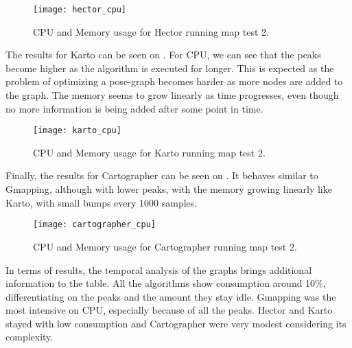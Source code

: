 \begin{figure}[!ht]
    \centering
    \texttt{[image: hector\_cpu]}
    \caption{CPU and Memory usage for Hector running map test 2.}
    \label{fig:hector_cpu}
\end{figure}

The results for Karto can be seen on . For CPU, we can see that the peaks become higher as the algorithm is executed for longer. This is expected as the problem of optimizing a pose-graph becomes harder as more nodes are added to the graph. The memory seems to grow linearly as time progresses, even though no more information is being added after some point in time.

\begin{figure}[!ht]
    \centering
    \texttt{[image: karto\_cpu]}
    \caption{CPU and Memory usage for Karto running map test 2.}
    \label{fig:karto_cpu}
\end{figure}

Finally, the results for Cartographer can be seen on . It behaves similar to Gmapping, although with lower peaks, with the memory growing linearly like Karto, with small bumps every 1000 samples.

\begin{figure}[!ht]
    \centering
    \texttt{[image: cartographer\_cpu]}
    \caption{CPU and Memory usage for Cartographer running map test 2.}
    \label{fig:cartographer_cpu}
\end{figure}

In terms of results, the temporal analysis of the graphs brings additional information to the table. All the algorithms show consumption around 10\%, differentiating on the peaks and the amount they stay idle. Gmapping was the most intensive on CPU, especially because of all the peaks. Hector and Karto stayed with low consumption and Cartographer were very modest considering its complexity. 